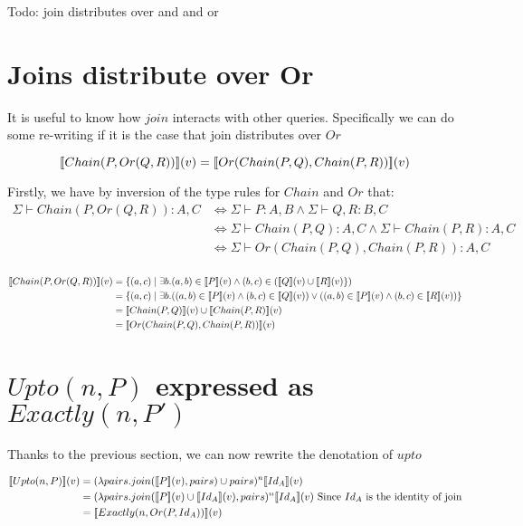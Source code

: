 \documentclass[12pt,a4paper,twoside,openright]{report}
\newcommand{\db}[1]{{\bf [\![}#1{\bf ]\!]}}
\newcommand{\deno}[1]{\db{#1}(v)}
\newcommand{\setComp}[2]{\left\lbrace #1 \mid #2 \right\rbrace}
\newcommand{\typeRule}[2]{\Sigma\vdash #1 \colon #2}
\newcommand{\denoRule}[2]{#1 \in \deno{#2}}
\begin{document}
{{Todo: join distributes over and and or

\section{Joins distribute over Or}

It is useful to know how $join$ interacts with other queries. Specifically we can do some re-writing if it is the case that join distributes over $Or$

\begin{equation}
\deno{Chain(P, Or(Q, R))} = \deno{Or(Chain(P,Q), Chain(P, R))}
\end{equation}

Firstly, we have by inversion of the type rules for $Chain$ and $Or$ that:
\begin{equation}\label{typeEquality}
\begin{split}
	\typeRule{Chain(P, Or(Q, R))}{A, C} & \Leftrightarrow \typeRule{P}{A, B} \wedge \typeRule{Q, R}{B, C}\\
									   & \Leftrightarrow \typeRule{Chain(P,Q)}{A, C} \wedge \typeRule{Chain(P, R)}{A, C}\\
									   & \Leftrightarrow \typeRule{Or(Chain(P,Q), Chain(P, R))}{A, C}\\
\end{split}
\end{equation}

\begin{equation}\label{denotationalEquality}
\begin{split}
\deno{Chain(P, Or(Q, R))} & = \setComp{(a, c)}{\exists b. \denoRule{(a, b)}{P} \wedge (b,c) \in (\deno{Q} \cup \deno{R}})\\
						 & = \setComp{(a, c)}{\exists b. (\denoRule{(a, b)}{P} \wedge \denoRule{(b,c)}{Q}) \vee (\denoRule{(a, b)}{P} \wedge \denoRule{(b,c)}{R})}\\
						 & = \deno{Chain(P, Q)} \cup \deno{Chain(P, R)}\\
						 & = \deno{Or(Chain(P, Q), Chain(P, R))}
\end{split}
\end{equation}


\section{$Upto(n, P)$ expressed as $Exactly(n, P')$}
Thanks to the previous section, we can now rewrite the denotation of $upto$

\begin{equation}
\label{UptoToExactly}
\begin{split}
\deno{Upto(n, P)} & = (\lambda pairs. join(\deno{P}, pairs) \cup pairs)^n \deno{Id_A}\\
				  & = (\lambda pairs. join(\deno{P} \cup \deno{Id_A}, pairs)^n \deno{Id_A} \mbox{ Since $Id_A$ is the identity of join}\\
				  & = \deno{Exactly(n, Or(P, Id_A))}
\end{split}
\end{equation}

}}
\end{document}
